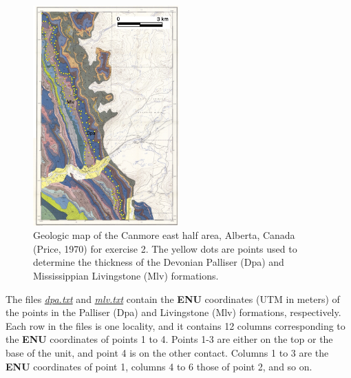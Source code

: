 \documentclass[a4paper , 12pt]{book}
\begin{document}
\begin{enumerate}
     \begin{figure}
        \caption{Geologic map of the Canmore east half area, Alberta, Canada (Price, 1970) for exercise 2. The yellow dots are points used to determine the thickness of the Devonian Palliser (Dpa) and Mississippian Livingstone (Mlv) formations.}
        \includegraphics[width=0.5\textwidth]{Figures/ch5f14.jpg}
    \end{figure}
    
    The files \href{https://github.com/nfcd/compGeo/blob/master/source/data/ch5-exercise2/dpa.txt}{\textit{dpa.txt}} and \href{https://github.com/nfcd/compGeo/blob/master/source/data/ch5-exercise2/mlv.txt}{\textit{mlv.txt}} contain the \textbf{ENU} coordinates (UTM in meters) of the points in the Palliser (Dpa) and Livingstone (Mlv) formations, respectively. Each row in the files is one locality, and it contains 12 columns corresponding to the \textbf{ENU} coordinates of points 1 to 4. Points 1-3 are either on the top or the base of the unit, and point 4 is on the other contact. Columns 1 to 3 are the \textbf{ENU} coordinates of point 1, columns 4 to 6 those of point 2, and so on.
    

\end{enumerate}
\end{document}
